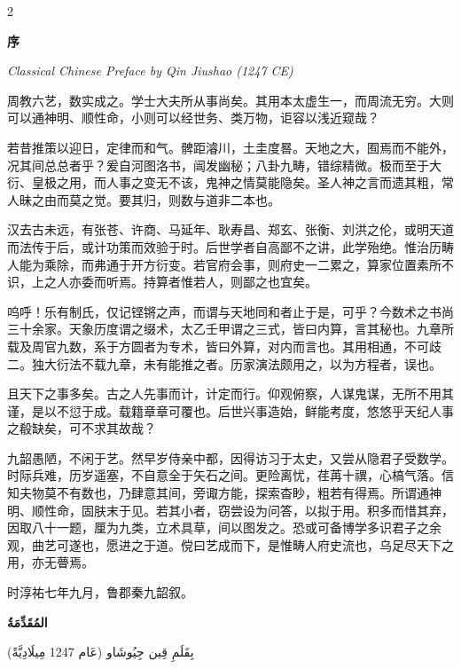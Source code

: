 \documentclass[11pt,a4paper]{article}
\newcommand{\ar}[1]{\arabicfont\beginR #1\endR}
\newcommand{\zhtext}[1]{{\chinese #1}}
\newenvironment{bilingual}{%
  \begin{paracol}{2}
}{%
  \end{paracol}
}
\begin{document}
\begin{bilingual}

\begin{leftcolumn*}
\textbf{\zhtext{序}}

\textit{Classical Chinese Preface by Qin Jiushao (1247 CE)}

\medskip

周教六艺，数实成之。学士大夫所从事尚矣。其用本太虚生一，而周流无穷。大则可以通神明、顺性命，小则可以经世务、类万物，讵容以浅近窥哉？

若昔推策以迎日，定律而和气。髀距濬川，土圭度晷。天地之大，囿焉而不能外，况其间总总者乎？爰自河图洛书，闿发幽秘；八卦九畴，错综精微。极而至于大衍、皇极之用，而人事之变无不该，鬼神之情莫能隐矣。圣人神之言而遗其粗，常人昧之由而莫之觉。要其归，则数与道非二本也。

汉去古未远，有张苍、许商、马延年、耿寿昌、郑玄、张衡、刘洪之伦，或明天道而法传于后，或计功策而效验于时。后世学者自高鄙不之讲，此学殆绝。惟治历畴人能为乘除，而弗通于开方衍变。若官府会事，则府史一二累之，算家位置素所不识，上之人亦委而听焉。持算者惟若人，则鄙之也宜矣。

呜呼！乐有制氏，仅记铿锵之声，而谓与天地同和者止于是，可乎？今数术之书尚三十余家。天象历度谓之缀术，太乙壬甲谓之三式，皆曰内算，言其秘也。九章所载及周官九数，系于方圆者为专术，皆曰外算，对内而言也。其用相通，不可歧二。独大衍法不载九章，未有能推之者。历家演法颇用之，以为方程者，误也。

且天下之事多矣。古之人先事而计，计定而行。仰观俯察，人谋鬼谋，无所不用其谨，是以不愆于成。载籍章章可覆也。后世兴事造始，鲜能考度，悠悠乎天纪人事之殽缺矣，可不求其故哉？

九韶愚陋，不闲于艺。然早岁侍亲中都，因得访习于太史，又尝从隐君子受数学。时际兵难，历岁遥塞，不自意全于矢石之间。更险离忧，荏苒十禩，心槁气落。信知夫物莫不有数也，乃肆意其间，旁诹方能，探索杳眇，粗若有得焉。所谓通神明、顺性命，固肤末于见。若其小者，窃尝设为问答，以拟于用。积多而惜其弃，因取八十一题，厘为九类，立术具草，间以图发之。恐或可备博学多识君子之余观，曲艺可遂也，愿进之于道。傥曰艺成而下，是惟畴人府史流也，乌足尽天下之用，亦无瞢焉。

\medskip

\hfill\zhtext{时淳祐七年九月，鲁郡秦九韶叙。}
\end{leftcolumn*}

\begin{rightcolumn*}
\ar{\textbf{المُقَدِّمَةُ}}

\ar{بِقَلَمِ قِين جِيُوشَاو (عَام 1247 مِيلَادِيَّةً)}

\medskip


\end{rightcolumn*}
\end{bilingual}
\end{document}
